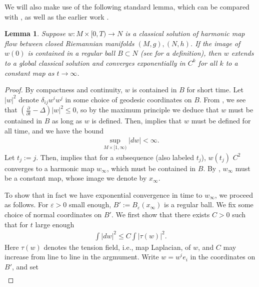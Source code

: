 \documentclass[12pt]{amsart}
\renewcommand{\1}{{\mathbf 1}}
\newtheorem{lemma}[thm]{Lemma}
\theoremstyle{others}
\numberwithin{equation}{section}
\begin{document}
We will also make use of the following standard lemma, which can be compared with \cite[Thm. 1.4]{bolingkelleherstreets}, as well as the earlier work \cite[Cor. 1.1]{chending}.
\begin{lemma}\label{lemma:regularballlemma}
    Suppose \(w : M \times [0, T) \to N\) is a classical solution of harmonic map flow between closed Riemannian manifolds \((M, g), (N, h)\). If the image of \(w(0)\) is contained in a regular ball \(B \subset N\) (see \cite{Harmonicmapsintoregballs} for a definition), then \(w\) extends to a global classical solution and converges exponentially in \(C^k\) for all \(k\) to a constant map as \(t \to \infty\). 
\end{lemma}
\begin{proof}
   By compactness and continuity, \(w\) is contained in \(B\) for short time. Let \(|w|^2\) denote \(\delta_{ij}w^iw^j\) in some choice of geodesic coordinates on \(B\). From \cite[(2.22)]{Harmonicmapsintoregballs}, we see that \(\left(\frac{\partial}{\partial t} - \Delta\right)|w|^2 \leq 0\), so by the maximum principle we deduce that \(w\) must be contained in \(B\) as long as \(w\) is defined. Then, \cite[Theorem 2.2]{HMFintoregballs} implies that \(w\) must be defined for all time, and we have the bound
\begin{align}\label{regularballlemma:derivativebound}
    \sup_{M \times [1, \infty)} |dw| < \infty.
\end{align} Let \(t_j := j\). Then, \cite[Theorem 4.1]{HMFintoregballs} implies that for a subsequence (also labeled \(t_j\)), \(w( t_j)\) \(C^2\) converges to a harmonic map \(w_\infty\), which must be contained in \(B\). By  \cite[Theorem 1]{Harmonicmapsintoregballs}, \(w_\infty\) must be a constant map, whose image we denote by \(x_\infty\). \par
To show that in fact we have exponential convergence in time to \(w_\infty\), we proceed as follows. For \(\varepsilon > 0\) small enough, \(B' := B_\varepsilon(x_\infty)\) is a regular ball. We fix some choice of normal coordinates on \(B'\). We first show that there exists \(C > 0\) such that for \(t\) large enough
    \begin{align}\label{regularballlemma:tensionboundsenergy}
        \int |dw|^2 \leq C \int |\tau(w)|^2.
    \end{align} Here \(\tau(w)\) denotes the tension field, i.e., map Laplacian, of \(w\), and \(C\) may increase from line to line in the argmument.  Write \(w = w^i e_i\) in the coordinates on \(B'\), and set
    \begin{align*}

\end{align*}
\end{proof}
\end{document}
